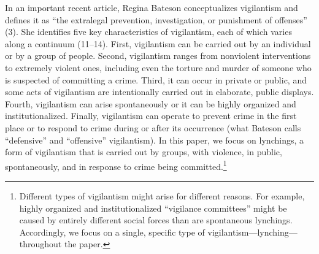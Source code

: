 \documentclass[12pt,ansiapaper]{article}
\begin{document}
In an important recent article, Regina Bateson \citeyearpar{bateson2020politics} conceptualizes vigilantism and defines it as ``the extralegal prevention, investigation, or punishment of offenses'' (3). She identifies five key characteristics of vigilantism, each of which varies along a continuum (11--14). First, vigilantism can be carried out by an individual or by a group of people. Second, vigilantism ranges from nonviolent interventions to extremely violent ones, including even the torture and murder of someone who is suspected of committing a crime. Third, it can occur in private or public, and some acts of vigilantism are intentionally carried out in elaborate, public displays. Fourth, vigilantism can arise spontaneously or it can be highly organized and institutionalized. Finally, vigilantism can operate to prevent crime in the first place or to respond to crime during or after its occurrence (what Bateson calls ``defensive'' and ``offensive'' vigilantism). In this paper, we focus on lynchings, a form of vigilantism that is carried out by groups, with violence, in public, spontaneously, and in response to crime being committed.\footnote{Different types of vigilantism might arise for different reasons. For example, highly organized and institutionalized ``vigilance committees'' might be caused by entirely different social forces than are spontaneous lynchings. Accordingly, we focus on a single, specific type of vigilantism---lynching---throughout the paper.}  
\end{document}
